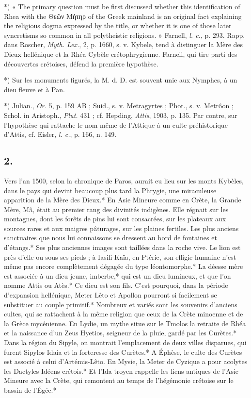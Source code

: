 \documentclass[a4paper, 11pt, oneside, polutonikogreek, french]{article}
\begin{document}
*) « The primary question must be first discussed whether this identification of Rhea with the Θεῶν Μήτηρ of the Greek mainland is an original fact explaining the religious dogma expressed by the title, or whether it is one of those later syncretisms so common in all polytheistic religions. » Farnell, \emph{l. c.}, p. 293. Rapp, dans Roscher, \emph{Myth. Lex.}, 2, p. 1660, s. v. Kybele, tend à distinguer la Mère des Dieux hellénique et la Rhéa Cybèle crétophrygienne. Farnell, qui tire parti des découvertes crétoises, défend la première hypothèse.

*) Sur les monuments figurés, la M. d. D. est souvent unie aux Nymphes, à un dieu fleuve et à Pan.

*) Julian., \emph{Or.} 5, p. 159 AB ; Suid., s. v. Metragyrtes ; Phot., s. v. Metrôon ; Schol. in Aristoph., \emph{Plut.} 431 ; cf. Hepding, \emph{Attis}, 1903, p. 135. Par contre, sur l'hypothèse qui rattache le nom même de l'Attique à un culte préhistorique d'Attis, cf. Eisler, \emph{l. c.}, p. 166, n. 149.

\subsection{2.}

Vers l'an 1500, selon la chronique de Paros, aurait eu lieu sur les monts Kybèles, dans le pays qui devint beaucoup plus tard la Phrygie, une miraculeuse apparition de la Mère des Dieux.* En Asie Mineure comme en Crète, la Grande Mère, Mâ, était au premier rang des divinités indigènes. Elle régnait sur les montagnes, dont les forêts de pins lui sont consacrées, sur les plateaux aux sources rares et aux maigres pâturages, sur les plaines fertiles. Les plus anciens sanctuaires que nous lui connaissons se dressent au bord de fontaines et d'étangs.* Ses plus anciennes images sont taillées dans la roche vive. Le lion est près d'elle ou sous ses pieds ; à Iasili-Kaïa, en Ptérie, son effigie humaine n'est même pas encore complètement dégagée du type léontomorphe.* La déesse mère est associée à un dieu jeune, imberbe,* qui est un dieu lumineux, et que l'on nomme Attis ou Atès.* Ce dieu est son fils. C'est pourquoi, dans la période d'expansion hellénique, Meter Lêto et Apollon pourront si facilement se substituer au couple primitif.* Nombreux et variés sont les souvenirs d'anciens cultes, qui se rattachent à la même religion que ceux de la Crète minoenne et de la Grèce mycénienne. En Lydie, un mythe situe sur le Tmolos la retraite de Rhéa et la naissance d'un Zeus Hyetios, seigneur de la pluie, gardé par les Curètes.* Dans la région du Sipyle, on montrait l'emplacement de deux villes disparues, qui furent Sipylos Idaia et la forteresse des Curètes.* A Éphèse, le culte des Curètes est associé à celui d'Artémis-Lêto. En Mysie, la Meter de Cyzique a pour acolytes les Dactyles Idéens crétois.* Et l'Ida troyen rappelle les liens antiques de l'Asie Mineure avec la Crète, qui remontent au temps de l'hégémonie crétoise sur le bassin de l'Égée.*
\end{document}
